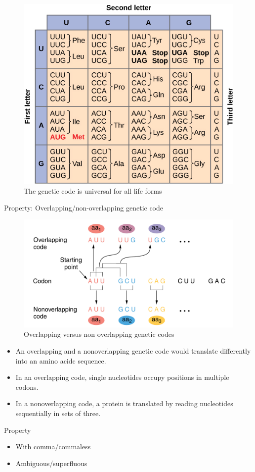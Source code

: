 \documentclass[11pt,dvipsnames,ignorenonframetext,aspectratio=169]{beamer}
\providecommand{\tightlist}{%
  \setlength{\itemsep}{0pt}\setlength{\parskip}{0pt}}
\begin{document}
\begin{frame}{}
\protect\hypertarget{section-5}{}
\begin{figure}
\includegraphics[width=0.45\linewidth]{./../images/nucleotide_codons} \caption{The genetic code is universal for all life forms}\label{fig:universality}
\end{figure}
\end{frame}

\begin{frame}{Property: Overlapping/non-overlapping genetic code}
\protect\hypertarget{property-overlappingnon-overlapping-genetic-code}{}
\begin{figure}
\includegraphics[width=0.4\linewidth]{./../images/overlap_non_overlap} \caption{Overlapping versus non overlapping genetic codes}\label{fig:overlap-n-non}
\end{figure}

\begin{itemize}
\tightlist
\item
  An overlapping and a nonoverlapping genetic code would translate
  differently into an amino acidc sequence.
\item
  In an overlapping code, single nucleotides occupy positions in
  multiple codons.
\item
  In a nonoverlapping code, a protein is translated by reading
  nucleotides sequentially in sets of three.
\end{itemize}
\end{frame}

\begin{frame}{Property}
\protect\hypertarget{property}{}
\begin{itemize}
\tightlist
\item
  With comma/commaless
\item
  Ambiguous/superfluous
\end{itemize}
\end{frame}
\end{document}
